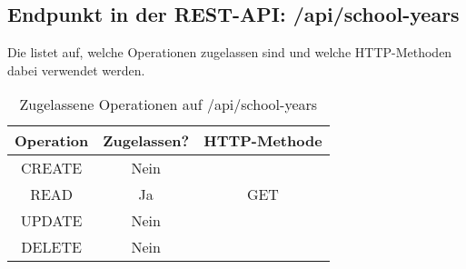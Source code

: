 \subsection{Endpunkt in der REST-API: /api/school-years}
\label{sec:end:rest:api:school-years}
Die  listet auf, welche Operationen zugelassen sind und welche HTTP-Methoden dabei verwendet werden. 


\begin{table}[!htbp]
	\begin{tabular}{|c|c|c|}
		\hline
			\textbf{Operation} & \textbf{Zugelassen?} & \textbf{HTTP-Methode} \\ \hline
			CREATE & Nein & \\ \hline 
			READ & Ja & GET \\ \hline
			UPDATE & Nein & \\ \hline 
			DELETE & Nein & \\ \hline
	\end{tabular}

		\caption{Zugelassene Operationen auf /api/school-years}
		\label{tab:end:rest:api:school_years:meth}
\end{table}